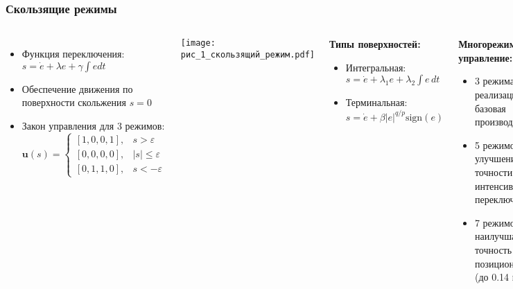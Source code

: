 \begin{frame}
	\frametitle{Скользящие режимы}

	\vspace{-0.5cm}

	\begin{columns}[t]
		\scriptsize

		\begin{itemize}
			\item Функция переключения: $s = \dot{e} + \lambda e + \gamma\int e dt$
			\item Обеспечение движения по поверхности скольжения $s=0$
			\item Закон управления для 3 режимов:
			      \begin{equation*}
				      \mathbf{u}(s) = \begin{cases}
					      [1,0,0,1], & s > \varepsilon      \\
					      [0,0,0,0], & |s| \leq \varepsilon \\
					      [0,1,1,0], & s < -\varepsilon
				      \end{cases}
			      \end{equation*}
		\end{itemize}

		\vspace{-0.25cm}
		\texttt{[image: рис\_1\_скользящий\_режим.pdf]}

		\begin{block}{\scriptsize\textbf{Типы поверхностей:}}
			\begin{itemize}
				\item Интегральная: $s = \dot{e} + \lambda_1 e + \lambda_2 \int e\, dt$
				\item Терминальная: $s = \dot{e} + \beta |e|^{q/p}\text{sign}(e)$
			\end{itemize}
		\end{block}

		\begin{block}{\scriptsize\textbf{Многорежимное управление:}}
			\begin{itemize}
				\item 3 режима: простота реализации, базовая производительность
				\item 5 режимов: улучшение точности, снижение интенсивности переключений
				\item 7 режимов: наилучшая точность позиционирования (до 0.14 мм)
			\end{itemize}
		\end{block}


\end{columns}
\end{frame}
